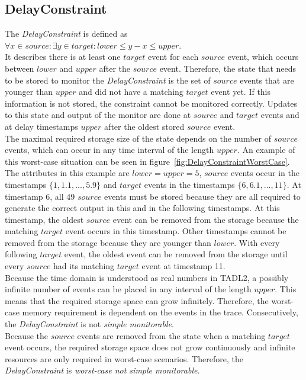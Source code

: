 \subsection{DelayConstraint}
	\label{monitorability_DelayConstraint}
	The \emph{DelayConstraint} is defined as\\[10pt]
	\begin{math}
		\forall x\in source:\exists y\in target: lower\leq y-x\leq upper.
	\end{math}\\[10pt]
	It describes there is at least one $target$ event for each $source$ event, which occurs between $lower$ and $upper$ after the $source$ event. Therefore, the state that needs to be stored to monitor the \emph{DelayConstraint} is the set of $source$ events that are younger than $upper$ and did not have a matching $target$ event yet. If this information is not stored, the constraint cannot be monitored correctly. Updates to this state and output of the monitor are done at $source$ and $target$ events and at delay timestamps $upper$ after the oldest stored $source$ event.\\
	The maximal required storage size of the state depends on the number of $source$ events, which can occur in any time interval of the length $upper$. An example of this worst-case situation can be seen in figure~\ref{fig:DelayConstraintWorstCase}. The attributes in this example are $lower=upper=5$, $source$ events occur in the timestamps $\{1, 1.1, ..., 5.9\}$ and $target$ events in the timestamps $\{6, 6.1, ..., 11\}$. At timestamp 6, all 49 $source$ events must be stored because they are all required to generate the correct output in this and in the following timestamps. At this timestamp, the oldest $source$ event can be removed from the storage because the matching $target$ event occurs in this timestamp. Other timestamps cannot be removed from the storage because they are younger than $lower$. With every following $target$ event, the oldest event can be removed from the storage until every $source$ had its matching $target$ event at timestamp 11.\\
	Because the time domain is understood as real numbers in TADL2, a possibly infinite number of events can be placed in any interval of the length $upper$. This means that the required storage space can grow infinitely. Therefore, the worst-case memory requirement is dependent on the events in the trace. Consecutively, the \textit{DelayConstraint} is not \textit{simple monitorable}.\\
	Because the $source$ events are removed from the state when a matching $target$ event occurs, the required storage space does not grow continuously and infinite resources are only required in worst-case scenarios. Therefore, the \emph{DelayConstraint} is \emph{worst-case not simple monitorable}.
